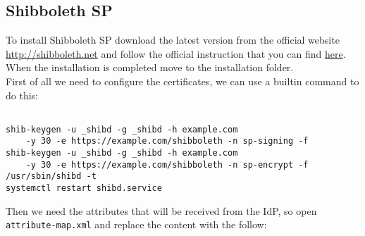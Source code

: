 \subsection{Shibboleth SP}
To install Shibboleth SP download the latest version from the official website \href{http://shibboleth.net}{http://shibboleth.net} and follow the official instruction that you can find \href{https://shibboleth.atlassian.net/wiki/spaces/SP3/pages/2065335537/Installation}{here}.\\
When the installation is completed move to the installation folder. \\
First of all we need to configure the certificates, we can use a builtin command to do this:
\begin{verbatim}

shib-keygen -u _shibd -g _shibd -h example.com
    -y 30 -e https://example.com/shibboleth -n sp-signing -f
shib-keygen -u _shibd -g _shibd -h example.com 
    -y 30 -e https://example.com/shibboleth -n sp-encrypt -f
/usr/sbin/shibd -t
systemctl restart shibd.service
\end{verbatim}
Then we need the attributes that will be received from the IdP, so open \texttt{attribute-map.xml} and replace the content with the follow:

